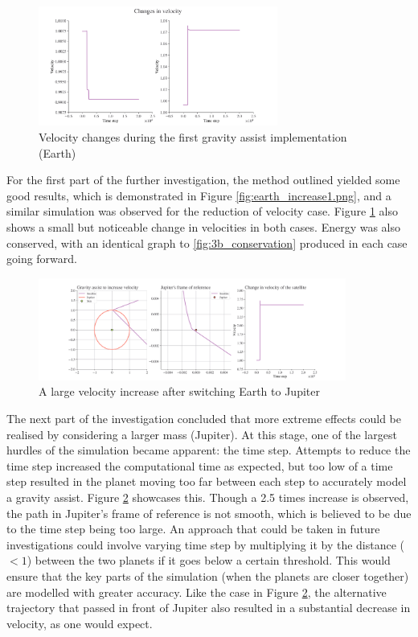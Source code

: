 \documentclass[11pt, english]{report}
\begin{document}
\begin{figure}[ht]
    \centering
    \includegraphics[width=0.7\textwidth]{graphics/earth_velocity_change1.png}
    \caption{Velocity changes during the first gravity assist  implementation (Earth)}
    \label{fig:earth_change1}
\end{figure}


\normalsize{\noindent For the first part of the further investigation, the method outlined yielded some good results, which is demonstrated in Figure \ref{fig:earth_increase1.png}, and a similar simulation was observed for the reduction of velocity case. Figure \ref{fig:earth_change1} also shows a small but noticeable change in velocities in both cases. Energy was also conserved, with an identical graph to \ref{fig:3b_conservation} produced in each case going forward.

\begin{figure}[ht]
    \centering
    \includegraphics[width=0.9\textwidth]{graphics/jupiter_big_increase.png}
    \caption{A large velocity increase after switching Earth to Jupiter}
    \label{fig:jupiter_big_increase}
\end{figure}

The next part of the investigation concluded that more extreme effects could be realised by considering a larger mass (Jupiter). At this stage, one of the largest hurdles of the simulation became apparent: the time step. Attempts to reduce the time step increased the computational time as expected, but too low of a time step resulted in the planet moving too far between each step to accurately model a gravity assist. Figure \ref{fig:jupiter_big_increase} showcases this. Though a 2.5 times increase is observed, the path in Jupiter's frame of reference is not smooth, which is believed to be due to the time step being too large. An approach that could be taken in future investigations could involve varying time step by multiplying it by the distance ($<1$) between the two planets if it goes below a certain threshold. This would ensure that the key parts of the simulation (when the planets are closer together) are modelled with greater accuracy. Like the case in Figure \ref{fig:jupiter_big_increase}, the alternative trajectory that passed in front of Jupiter also resulted in a substantial decrease in velocity, as one would expect.

}
\end{document}
